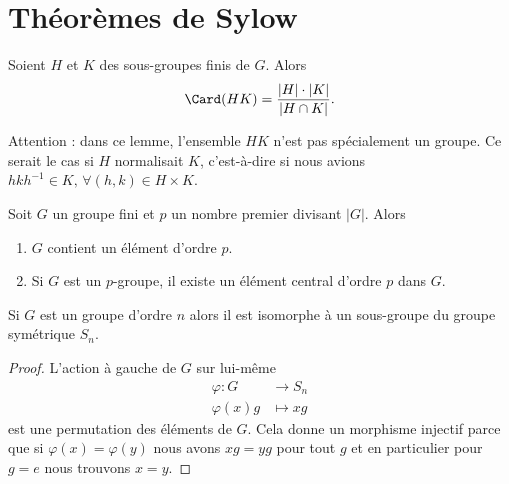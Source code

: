 
\section{Théorèmes de Sylow}

\begin{lemma}
	Soient \( H\) et \( K\) des sous-groupes finis de \( G\). Alors
	\begin{equation}
		\Card(HK)=\frac{ | H |\cdot | K | }{ | H\cap K | }.
	\end{equation}
\end{lemma}
Attention : dans ce lemme, l'ensemble \( HK\) n'est pas spécialement un groupe. Ce serait le cas si \( H\) normalisait \( K\), c'est-à-dire si nous avions \( hkh^{-1}\in K,\,\forall (h,k)\in H\times K\).

\begin{theorem}\label{ThoCauchyGpFini}
	Soit \( G\) un groupe fini et \( p\) un nombre premier divisant \( | G |\). Alors
	\begin{enumerate}
		\item
		      \( G\) contient un élément d'ordre \( p\).
		\item
		      Si \( G\) est un \( p\)-groupe, il existe un élément central d'ordre \( p\) dans \( G\).
	\end{enumerate}
\end{theorem}

\begin{lemma}    \label{ThoIfdlEB}   
	Si \( G\) est un groupe d'ordre \( n\) alors il est isomorphe à un sous-groupe du groupe symétrique \( S_n\).
\end{lemma}

\begin{proof}
	L'action à gauche de \( G\) sur lui-même
	\begin{equation}
		\begin{aligned}
			\varphi\colon G & \to S_n    \\
			\varphi(x)g     & \mapsto xg
		\end{aligned}
	\end{equation}
	est une permutation des éléments de \( G\). Cela donne un morphisme injectif parce que si \( \varphi(x)=\varphi(y)\) nous avons \( xg=yg\) pour tout \( g\) et en particulier pour \( g=e\) nous trouvons \( x=y\).
\end{proof}

